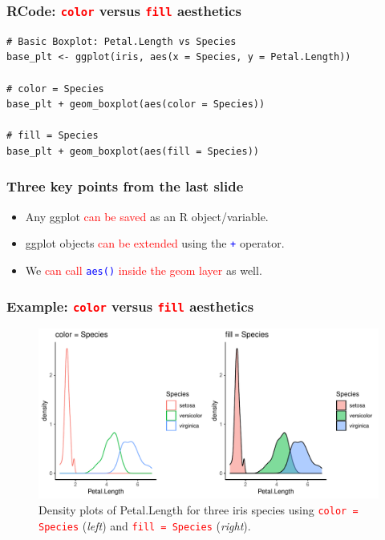 \documentclass{beamer}
\begin{document}
\begin{frame}[fragile]\frametitle{RCode: \textcolor{red}{\texttt{color}} versus \textcolor{red}{\texttt{fill}} aesthetics}
\lstset{basicstyle=\Large\ttfamily}
\begin{lstlisting}
# Basic Boxplot: Petal.Length vs Species
base_plt <- ggplot(iris, aes(x = Species, y = Petal.Length))

# color = Species
base_plt + geom_boxplot(aes(color = Species))

# fill = Species
base_plt + geom_boxplot(aes(fill = Species))
\end{lstlisting}
\end{frame}

\begin{frame}\frametitle{Three key points from the last slide}
\Large
\begin{itemize}
\item Any ggplot \textcolor{red}{can be saved} as an R object/variable.
\vspace{0.3in}
\item ggplot objects \textcolor{red}{can be extended} using the \textcolor{blue}{\texttt{+}} operator.
\vspace{0.3in}
\item We \textcolor{red}{can call} \textcolor{blue}{\texttt{aes()}} \textcolor{red}{inside the geom layer} as well.
\end{itemize}
\end{frame}

\begin{frame}\frametitle{Example: \textcolor{red}{\texttt{color}} versus \textcolor{red}{\texttt{fill}} aesthetics}
\begin{figure}
\includegraphics[width=0.99\linewidth]{PlotsLec2/denplt_ex1}
\caption{\small{Density plots of Petal.Length for three iris species using \textcolor{red}{\texttt{color = Species}} (\textit{left}) and \textcolor{red}{\texttt{fill = Species}} (\textit{right}).}}
\end{figure}
\end{frame}
\end{document}
